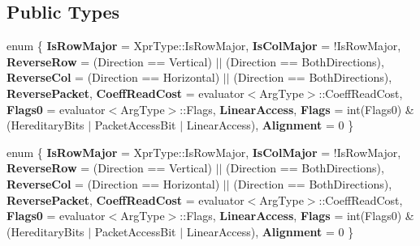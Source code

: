 \subsection*{Public Types}
\begin{DoxyCompactItemize}
\item 
\mbox{\label{struct_eigen_1_1internal_1_1unary__evaluator_3_01_reverse_3_01_arg_type_00_01_direction_01_4_01_4_a32eaff54cd87155baab230b4e95bede0}} 
enum \{ \newline
{\bfseries Is\+Row\+Major} = Xpr\+Type\+:\+:Is\+Row\+Major, 
{\bfseries Is\+Col\+Major} = !\+Is\+Row\+Major, 
{\bfseries Reverse\+Row} = (Direction == Vertical) $\vert$$\vert$ (Direction == Both\+Directions), 
{\bfseries Reverse\+Col} = (Direction == Horizontal) $\vert$$\vert$ (Direction == Both\+Directions), 
\newline
{\bfseries Reverse\+Packet}, 
{\bfseries Coeff\+Read\+Cost} = evaluator$<$Arg\+Type$>$\+:\+:Coeff\+Read\+Cost, 
{\bfseries Flags0} = evaluator$<$Arg\+Type$>$\+:\+:Flags, 
{\bfseries Linear\+Access}, 
\newline
{\bfseries Flags} = int(Flags0) \& (Hereditary\+Bits $\vert$ Packet\+Access\+Bit $\vert$ Linear\+Access), 
{\bfseries Alignment} = 0
 \}
\item 
\mbox{\label{struct_eigen_1_1internal_1_1unary__evaluator_3_01_reverse_3_01_arg_type_00_01_direction_01_4_01_4_ac4894f161a775613afe9caf3af9d75dc}} 
enum \{ \newline
{\bfseries Is\+Row\+Major} = Xpr\+Type\+:\+:Is\+Row\+Major, 
{\bfseries Is\+Col\+Major} = !\+Is\+Row\+Major, 
{\bfseries Reverse\+Row} = (Direction == Vertical) $\vert$$\vert$ (Direction == Both\+Directions), 
{\bfseries Reverse\+Col} = (Direction == Horizontal) $\vert$$\vert$ (Direction == Both\+Directions), 
\newline
{\bfseries Reverse\+Packet}, 
{\bfseries Coeff\+Read\+Cost} = evaluator$<$Arg\+Type$>$\+:\+:Coeff\+Read\+Cost, 
{\bfseries Flags0} = evaluator$<$Arg\+Type$>$\+:\+:Flags, 
{\bfseries Linear\+Access}, 
\newline
{\bfseries Flags} = int(Flags0) \& (Hereditary\+Bits $\vert$ Packet\+Access\+Bit $\vert$ Linear\+Access), 
{\bfseries Alignment} = 0
 \}
\item 
\mbox{\label{struct_eigen_1_1internal_1_1unary__evaluator_3_01_reverse_3_01_arg_type_00_01_direction_01_4_01_4_adbfd9e3b3db03f682acfa5171fbc2846}} 

\end{DoxyCompactItemize}
